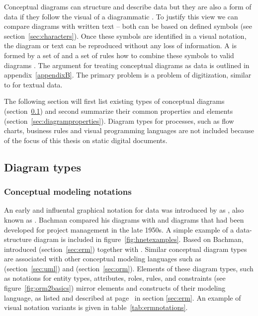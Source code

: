 Conceptual diagrams can structure and describe data but they are also a form of
data if they follow the visual  of a diagrammatic . To justify this view we can compare diagrams with written text -- both
can be based on defined symbols (see section~\ref{sec:characters}). Once these
symbols are identified in a visual notation, the diagram or text can be
reproduced without any loss of information. A  is formed
by a set of  and a set of rules how to
combine these symbols to valid diagrams \cite{Moody2009,Costagliola2004}.  The
argument for treating conceptual diagrams as data is outlined in
appendix~\ref{appendixB}. The primary problem is a problem of digitization,
similar to  for textual data.

The following section will first list existing types of conceptual diagrams
(section~\ref{sec:diagramtypes}) and second summarize their common properties
and elements (section~\ref{sec:diagramproperties}). Diagram types for
processes, such as flow charts, business rules and visual programming languages
are not included because of the focus of this thesis on static digital documents.


\subsection{Diagram types}
\label{sec:diagramtypes}

\subsubsection{Conceptual modeling notations}

An early and influental graphical notation for data was introduced by
\textcite{Bachman1969} as , also known as
 . Bachman compared his diagrams with  and 
diagrams that had been developed for project management in the late 1950s. A
simple example of a data-structure diagram is included in
figure~\ref{fig:hnetexamples}.  Based on Bachman, \textcite{Chen1976}
introduced  (section~\ref{sec:erm}) together with
. Similar
conceptual diagram types are associated with other conceptual modeling
languages such as  (section~\ref{sec:uml}) and 
(section~\ref{sec:orm}).  Elements of these diagram types, such as notations
for entity types, attributes, roles, rules, and constraints (see
figure~\ref{fig:orm2basics}) mirror elements and constructs of their modeling
language, as listed and described at page~\pageref{ermconceptualconstructs} in
section \ref{sec:erm}. An example of visual notation variants is given in
table~\ref{tab:ermnotations}.

